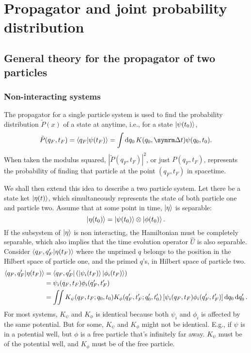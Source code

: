 \chapter{Propagator and joint probability distribution}

\section{General theory for the propagator of two particles}

\subsection{Non-interacting systems}

The propagator for a single particle system is used to find the probability distribution $\tilde{P}(x)$ of a state at anytime, i.e., for a state $\ket{\psi(t_0)}$,
\begin{equation}
    \tilde{P}(q_F, t_F) = \braket{q_F}{\psi(t_F)} = \int\dd{q_0}K(q_0, \Dd{t})\psi(q_0, t_0).
\end{equation}
When taken the modulus squared, $|\tilde{P}(q_F, t_F)|^2$, or just $P(q_F, t_F)$, represents the probability of finding that particle at the point $(q_F, t_F)$ in spacetime.

We shall then extend this idea to describe a two particle system. Let there be a state ket $\ket{\eta(t)}$, which simultaneously represents the state of both particle one and particle two. Assume that at some point in time, $\ket{\eta}$ is separable:
\begin{equation}
    \ket{\eta(t_0)} = \ket{\psi(t_0)} \otimes \ket{\phi(t_0)}.
\end{equation}
If the subsystem of $\ket{\eta}$ is non interacting, the Hamiltonian must be completely separable, which also implies that the time evolution operator $\hat{U}$ is also separable. Consider $\braket{q_F, q_F'}{\eta(t_F)}$ where the unprimed $q$ belongs to the position in the Hilbert space of particle one, and the primed $q$'s, in Hilbert space of particle two.
\begin{align*}
    \braket{q_F, q_F'}{\eta(t_F)} &= \bra{q_F, q_F'}\left(\ket{\psi_i(t_F)}\ket{\phi_i(t_F)}\right) \\
    &= \psi_i(q_F, t_F)\phi_i(q_F', t_F') \\
    &= \iint K_{\psi}(q_F, t_F; q_0, t_0)K_{\phi}(q_F', t_F'; q_0', t_0')\left[\psi_i(q_F, t_F)\phi_i(q_F', t_F')\right] \dd{q_0}\dd{q_0'}.
\end{align*}
For most systems, $K_{\psi}$ and $K_{\phi}$ is identical because both $\psi_i$ and $\phi_i$ is affected by the same potential. But for some, $K_{\psi}$ and $K_{\phi}$ might not be identical. E.g., if $\psi$ is in a potential well, but $\phi$ is a free particle that's infinitely far away. $K_{\psi}$ must be of the potential well, and $K_{\phi}$ must be of the free particle.

